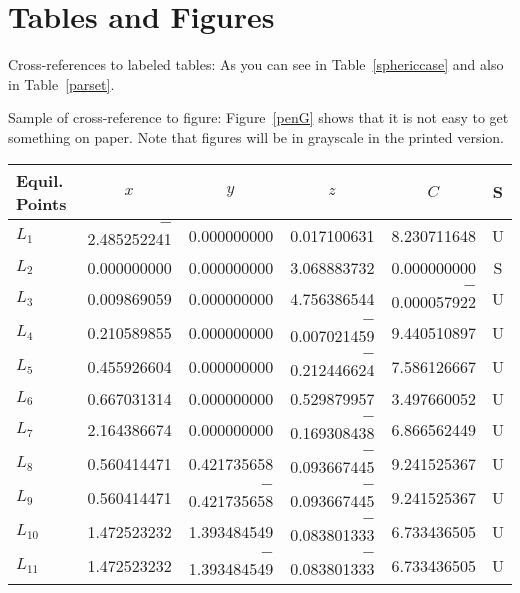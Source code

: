\documentclass[ecta,nameyear,draft]{econsocart}
\theoremstyle{plain}
\theoremstyle{definition}
\begin{document}
\section{Tables and Figures}
Cross-references to labeled tables: As you can see in Table~\ref{sphericcase}
and also in Table~\ref{parset}.

Sample of cross-reference to figure: Figure~\ref{penG} shows that it is not easy to get something on paper. Note that figures will be in grayscale in the printed version.
\begin{table*}
\caption{The spherical case ($I_1=0$, $I_2=0$).}
\label{sphericcase}
\begin{tabular}{@{}lrrrrc@{}@{}}
\hline
Equil. Points
& \multicolumn{1}{c}{$x$}
& \multicolumn{1}{c}{$y$}
& \multicolumn{1}{c}{$z$}
& \multicolumn{1}{c}{$C$}
& S \\
\hline
$L_1$    & $-$2.485252241 & 0.000000000    & 0.017100631    & 8.230711648    & U \\
$L_2$    & 0.000000000    & 0.000000000    & 3.068883732    & 0.000000000    & S \\
$L_3$    & 0.009869059    & 0.000000000    & 4.756386544    & $-$0.000057922 & U \\
$L_4$    & 0.210589855    & 0.000000000    & $-$0.007021459 & 9.440510897    & U \\
$L_5$    & 0.455926604    & 0.000000000    & $-$0.212446624 & 7.586126667    & U \\
$L_6$    & 0.667031314    & 0.000000000    & 0.529879957    & 3.497660052    & U \\
$L_7$    & 2.164386674    & 0.000000000    & $-$0.169308438 & 6.866562449    & U \\
$L_8$    & 0.560414471    & 0.421735658    & $-$0.093667445 & 9.241525367    & U \\
$L_9$    & 0.560414471    & $-$0.421735658 & $-$0.093667445 & 9.241525367    & U \\
$L_{10}$ & 1.472523232    & 1.393484549    & $-$0.083801333 & 6.733436505    & U \\
$L_{11}$ & 1.472523232    & $-$1.393484549 & $-$0.083801333 & 6.733436505    & U \\
\hline
\end{tabular}

\end{table*}
\end{document}
